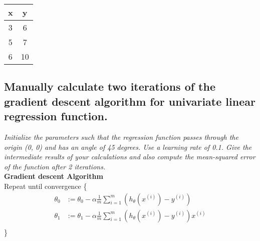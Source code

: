 \documentclass[12pt, a4paper]{article}
\begin{document}
\begin{table}[h!]
\centering
\begin{tabular}{c|c}
   x & y \\
   \hline
   3 & 6\\
   5 & 7\\
   6 & 10
\end{tabular}
\end{table}	

\subsection{Manually  calculate two iterations of the gradient descent algorithm
for univariate linear regression function. }

\textit{Initialize the parameters such that the regression function
passes through the origin (0, 0) and has an angle of 45 degrees. Use a learning rate of 0.1. Give the
intermediate results of your calculations and also compute the mean-squared error of the function
after 2 iterations.}\\

\textbf{Gradient descent Algorithm}\\

Repeat until convergence \{
\begin{align*}
\theta _0 &:= \theta _0 - \alpha \frac{1}{m} \sum\limits_{i=1}^m (h _{\theta} (x ^{(i)}) - y ^{(i)})\\
\theta _1 &:= \theta _1 - \alpha \frac{1}{m} \sum\limits_{i=1}^m (h _{\theta} (x ^{(i)}) - y ^{(i)})x^{(i)} \\
\end{align*}
\}
\end{document}
